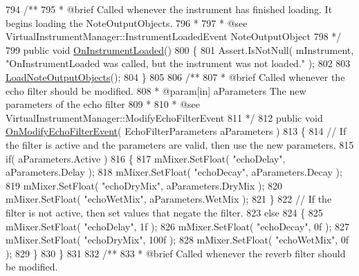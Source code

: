 \begin{DoxyCodeInclude}
794 \textcolor{comment}{    /**}
795 \textcolor{comment}{     * @brief Called whenever the instrument has finished loading. It begins loading the NoteOutputObjects.
       }
796 \textcolor{comment}{     * }
797 \textcolor{comment}{     * @see VirtualInstrumentManager::InstrumentLoadedEvent NoteOutputObject}
798 \textcolor{comment}{    */}
799     \textcolor{keyword}{public} \textcolor{keywordtype}{void} \hyperlink{group___v_i_m_handlers_gac7d5b65484e450a400e32ab416ebc9f6}{OnInstrumentLoaded}()
800     \{
801         Assert.IsNotNull( mInstrument, \textcolor{stringliteral}{"OnInstrumentLoaded was called, but the instrument was not loaded."} 
      );
802 
803         \hyperlink{group___v_i_m_priv_func_ga8817e32cc5074737b4d9489922b0fcb8}{LoadNoteOutputObjects}();
804     \}
805 \textcolor{comment}{}
806 \textcolor{comment}{    /**}
807 \textcolor{comment}{     * @brief Called whenever the echo filter should be modified.}
808 \textcolor{comment}{     * @param[in] aParameters The new parameters of the echo filter}
809 \textcolor{comment}{     * }
810 \textcolor{comment}{     * @see VirtualInstrumentManager::ModifyEchoFilterEvent}
811 \textcolor{comment}{    */}
812     \textcolor{keyword}{public} \textcolor{keywordtype}{void} \hyperlink{group___v_i_m_handlers_gae504c6ded8eb68ffb117c207fc25d99d}{OnModifyEchoFilterEvent}( EchoFilterParameters aParameters )
813     \{
814         \textcolor{comment}{// If the filter is active and the parameters are valid, then use the new parameters.}
815         \textcolor{keywordflow}{if}( aParameters.Active )
816         \{
817             mMixer.SetFloat( \textcolor{stringliteral}{"echoDelay"}, aParameters.Delay );
818             mMixer.SetFloat( \textcolor{stringliteral}{"echoDecay"}, aParameters.Decay );
819             mMixer.SetFloat( \textcolor{stringliteral}{"echoDryMix"}, aParameters.DryMix );
820             mMixer.SetFloat( \textcolor{stringliteral}{"echoWetMix"}, aParameters.WetMix );
821         \}
822         \textcolor{comment}{// If the filter is not active, then set values that negate the filter.}
823         \textcolor{keywordflow}{else}
824         \{
825             mMixer.SetFloat( \textcolor{stringliteral}{"echoDelay"}, 1f );
826             mMixer.SetFloat( \textcolor{stringliteral}{"echoDecay"}, 0f );
827             mMixer.SetFloat( \textcolor{stringliteral}{"echoDryMix"}, 100f );
828             mMixer.SetFloat( \textcolor{stringliteral}{"echoWetMix"}, 0f );
829         \}
830     \}
831 \textcolor{comment}{}
832 \textcolor{comment}{    /**}
833 \textcolor{comment}{     * @brief Called whenever the reverb filter should be modified.}

\end{DoxyCodeInclude}
